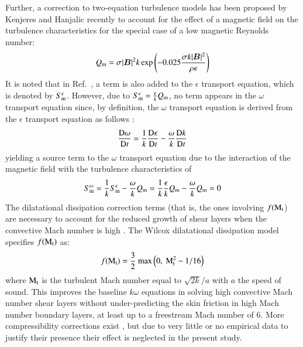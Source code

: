 \documentclass{warpdoc}
\renewcommand{\vec}[1]{\bm{#1}}
\begin{document}
Further, a correction to
two-equation turbulence models has been proposed by Kenjeres and Hanjalic \cite{misc:2000:kenjeres}
recently to account for the effect of a magnetic field on the turbulence characteristics for the
special case of a low magnetic Reynolds number:
%
\begin{equation}
  Q_{\rm m}=\sigma | \vec{B} |^2  k \exp \left( -0.025 \frac{\sigma k |\vec{B}|^2}{\rho \epsilon} \right)
\end{equation}
%
It is noted that in Ref.\ \cite{misc:2000:kenjeres}, a term is also added to the $\epsilon$ transport equation, which is
denoted by $S^\epsilon_{\rm m}$. However, due to $S^\epsilon_{\rm m}=\frac{\epsilon}{k} Q_{\rm m}$,
no term appears in the $\omega$ transport equation since, by definition, the $\omega$ transport
equation is derived from the $\epsilon$ transport equation as follows \cite{aiaa:1988:wilcox}:
%
\begin{equation}
  \frac{{\rm D} \omega}{{\rm D} t} = \frac{1}{k} \frac{{\rm D} \epsilon}{{\rm D} t}
         - \frac{\omega}{k} \frac{{\rm D} k}{{\rm D} t}
\end{equation}
%
yielding a source term to the $\omega$ transport equation
due to the interaction of the magnetic field with the turbulence
characteristics of
%
\begin{equation}
  S^\omega_{\rm m} = \frac{1}{k} S^\epsilon_{\rm m} - \frac{\omega}{k} Q_{\rm m}
                   = \frac{1}{k} \frac{\epsilon}{k} Q_{\rm m} - \frac{\omega}{k} Q_{\rm m} =0
\end{equation}
%
The dilatational dissipation correction terms (that is, the ones involving $f({\rm M}_{\rm t}$) are necessary to account for the reduced growth of shear layers when the convective Mach number is high \cite{jfm:1988:papamoschou, aiaabook:1991:dimotakis}.  The Wilcox \cite{aiaa:1992:wilcox} dilatational dissipation model specifies $f({\rm M}_{\rm t})$ as:
%
\begin{equation}
 f({\rm M}_{\rm t}) =
  \frac{3}{2}~{\rm max}\left( 0,~{\rm M}_{\rm t}^2-1/16\right)
\end{equation}
%
where ${\rm M}_{\rm t}$ is the turbulent Mach number equal to $\sqrt{2k}/a$ with $a$ the speed of sound. This improves the baseline $k\omega$ equations in solving high convective Mach number shear layers without under-predicting the skin friction in high Mach number boundary layers, at least up to a freestream Mach number of 6. More compressibility corrections exist \cite{nasa:1978:sislian, thesis:1996:krishnamurty,nasa:1994:coakley}, but due to very little or no empirical data to justify their presence their effect is neglected in the present study. 
\end{document}
